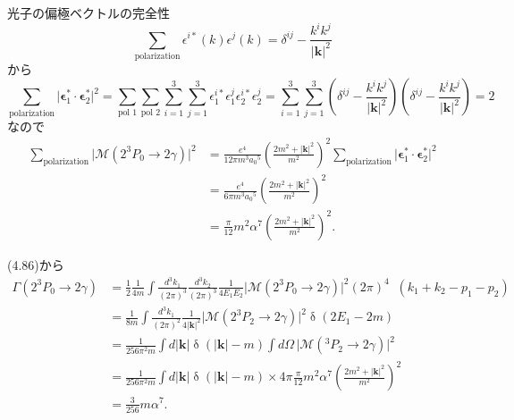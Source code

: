 光子の偏極ベクトルの完全性
\[
\sum_\text{polarization} \epsilon^{i\ast}(k) \epsilon^j(k) = \delta^{ij} - \frac{k^ik^j}{\lvert\boldsymbol{k}\rvert^2}
\]
から
\[
\sum_\text{polarization} \lvert\boldsymbol{\epsilon}_1^\ast \cdot \boldsymbol{\epsilon}_2^\ast\rvert^2
= \sum_\text{pol 1} \sum_\text{pol 2} \sum_{i=1}^3 \sum_{j=1}^3 \epsilon_1^{i\ast} \epsilon_1^j \epsilon_2^{i\ast} \epsilon_2^j
= \sum_{i=1}^3 \sum_{j=1}^3 \left( \delta^{ij} - \frac{k^ik^j}{\lvert\boldsymbol{k}\rvert^2} \right)
\left( \delta^{ij} - \frac{k^ik^j}{\lvert\boldsymbol{k}\rvert^2} \right)
= 2
\]
なので
\begin{align*}
  \sum_\text{polarization} \lvert\mathcal{M}(2^3P_0 \to 2\gamma)\rvert^2 &= \frac{e^4}{12\pi m^3 a_0{}^5} \left( \frac{2m^2 + \lvert\boldsymbol{k}\rvert^2}{m^2} \right)^2
  \sum_\text{polarization} \lvert\boldsymbol{\epsilon}_1^\ast \cdot \boldsymbol{\epsilon}_2^\ast\rvert^2 \\
  &= \frac{e^4}{6\pi m^3 a_0{}^5} \left( \frac{2m^2 + \lvert\boldsymbol{k}\rvert^2}{m^2} \right)^2 \\
  &= \frac{\pi}{12} m^2\alpha^7 \left( \frac{2m^2 + \lvert\boldsymbol{k}\rvert^2}{m^2} \right)^2 .
\end{align*}

(4.86)から
\begin{align*}
  \Gamma(2^3P_0 \to 2\gamma) &= \frac{1}{2} \frac{1}{4m} \int \frac{d^3k_1}{(2\pi)^3}\frac{d^3k_2}{(2\pi)^3} \frac{1}{4E_1E_2} \lvert \mathcal{M}(2^3P_0 \to 2\gamma) \rvert^2 (2\pi)^4 \mathop{\delta^{(4)}}(k_1+k_2-p_1-p_2) \\
  &= \frac{1}{8m} \int \frac{d^3k_1}{(2\pi)^2} \frac{1}{4\lvert \boldsymbol{k} \rvert^2}\lvert\mathcal{M}(2^3P_2 \to 2\gamma)\rvert^2 \mathop\delta(2E_1 - 2m) \\
  &= \frac{1}{256 \pi^2 m} \int d\lvert\boldsymbol{k}\rvert \mathop\delta(\lvert\boldsymbol{k}\rvert - m) \int d\Omega \, \lvert\mathcal{M}(^3P_2 \to 2\gamma)\rvert^2  \\
  &= \frac{1}{256 \pi^2 m} \int d\lvert\boldsymbol{k}\rvert \mathop\delta(\lvert\boldsymbol{k}\rvert - m)
  \times 4\pi \frac{\pi}{12} m^2\alpha^7 \left( \frac{2m^2 + \lvert\boldsymbol{k}\rvert^2}{m^2} \right)^2 \\
  &= \frac{3}{256} m\alpha^7 .
\end{align*}

